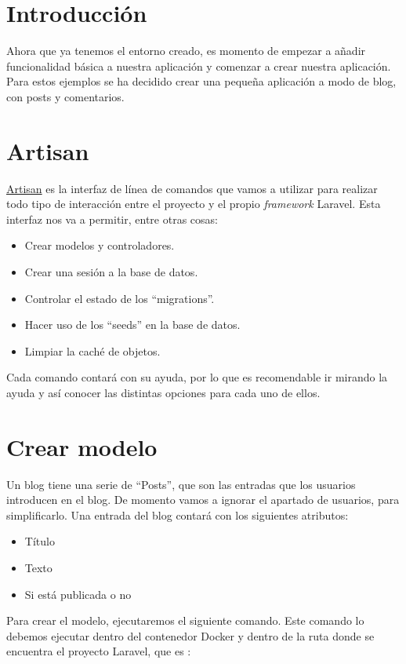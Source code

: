 \chapter{Introducción}

Ahora que ya tenemos el entorno creado, es momento de empezar a añadir funcionalidad básica a nuestra aplicación y comenzar a crear nuestra aplicación. Para estos ejemplos se ha decidido crear una pequeña aplicación a modo de blog, con posts y comentarios.

\chapter{Artisan}
\href{https://laravel.com/docs/10.x/artisan}{Artisan} es la interfaz de línea de comandos que vamos a utilizar para realizar todo tipo de interacción entre el proyecto y el propio \textit{framework} Laravel. Esta interfaz nos va a permitir, entre otras cosas:

\begin{itemize}
    \item Crear modelos y controladores.
    \item Crear una sesión a la base de datos.
    \item Controlar el estado de los “migrations”.
    \item Hacer uso de los “seeds” en la base de datos.
    \item Limpiar la caché de objetos.
\end{itemize}

Cada comando contará con su ayuda, por lo que es recomendable ir mirando la ayuda y así conocer las distintas opciones para cada uno de ellos.


\chapter{Crear modelo}
Un blog tiene una serie de “Posts”, que son las entradas que los usuarios introducen en el blog. De momento vamos a ignorar el apartado de usuarios, para simplificarlo. Una entrada del blog contará con los siguientes atributos:

\begin{itemize}
    \item Título
    \item Texto
    \item Si está publicada o no
\end{itemize}

Para crear el modelo, ejecutaremos el siguiente comando. Este comando lo debemos ejecutar dentro del contenedor Docker y dentro de la ruta donde se encuentra el proyecto Laravel, que es :

